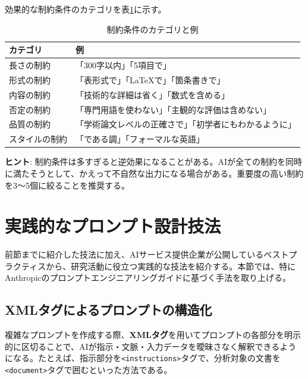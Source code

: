 効果的な制約条件のカテゴリを表\ref{tab:constraint_categories}に示す。

\begin{table}[htbp]
\centering
\caption{制約条件のカテゴリと例}
\label{tab:constraint_categories}
\begin{tabular}{ll}
\toprule
カテゴリ & 例 \\
\midrule
長さの制約 & 「300字以内」「5項目で」 \\
形式の制約 & 「表形式で」「\LaTeX で」「箇条書きで」 \\
内容の制約 & 「技術的な詳細は省く」「数式を含める」 \\
否定の制約 & 「専門用語を使わない」「主観的な評価は含めない」 \\
品質の制約 & 「学術論文レベルの正確さで」「初学者にもわかるように」 \\
スタイルの制約 & 「である調」「フォーマルな英語」 \\
\bottomrule
\end{tabular}
\end{table}

\begin{screen}
\textbf{ヒント}: 制約条件は多すぎると逆効果になることがある。AIが全ての制約を同時に満たそうとして、かえって不自然な出力になる場合がある。重要度の高い制約を3〜5個に絞ることを推奨する。
\end{screen}

\section{実践的なプロンプト設計技法}
\label{sec:practical_prompt}

前節までに紹介した技法に加え、AIサービス提供企業が公開しているベストプラクティスから、研究活動に役立つ実践的な技法を紹介する。本節では、特にAnthropicのプロンプトエンジニアリングガイドに基づく手法を取り上げる。

\subsection{XMLタグによるプロンプトの構造化}

複雑なプロンプトを作成する際、\textbf{XMLタグ}を用いてプロンプトの各部分を明示的に区切ることで、AIが指示・文脈・入力データを曖昧さなく解釈できるようになる。たとえば、指示部分を\texttt{<instructions>}タグで、分析対象の文書を\texttt{<document>}タグで囲むといった方法である。


